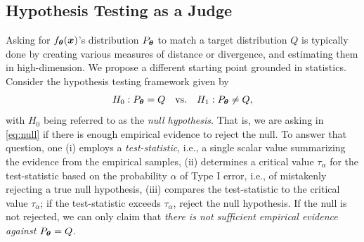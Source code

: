 \subsection{Hypothesis Testing as a Judge}
\label{sec:general_test}

Asking for $f_{{\bm{\theta}}}({\bm{x}})$'s distribution $P_{{\bm{\theta}}}$ to match a target distribution $Q$ is typically done by creating various measures of distance or divergence, and estimating them in high-dimension. We propose a different starting point grounded in statistics. 
Consider the hypothesis testing framework \citep{fisher1928statistical,neyman1933ix} given by
\begin{align}
H_0: P_{{\bm{\theta}}}=Q \quad \text{vs.} \quad H_1: P_{{\bm{\theta}}}\neq Q,    \label{eq:null}
\end{align}
with $H_0$ being referred to as the {\em null hypothesis}. That is, we are asking in \cref{eq:null} if there is enough empirical evidence to reject the null. To answer that question, one (i) employs a {\em test-statistic}, i.e., a single scalar value summarizing the evidence from the empirical samples, (ii) determines a critical value $\tau_{\alpha}$ for the test-statistic based on the probability $\alpha$ of Type I error, i.e., of mistakenly rejecting a true null hypothesis, (iii) compares the test-statistic to the critical value $\tau_{\alpha}$; if the test-statistic exceeds $\tau_{\alpha}$, reject the null hypothesis. If the null is not rejected, we can only claim that {\em there is not sufficient empirical evidence against $P_{{\bm{\theta}}}=Q$}. 


